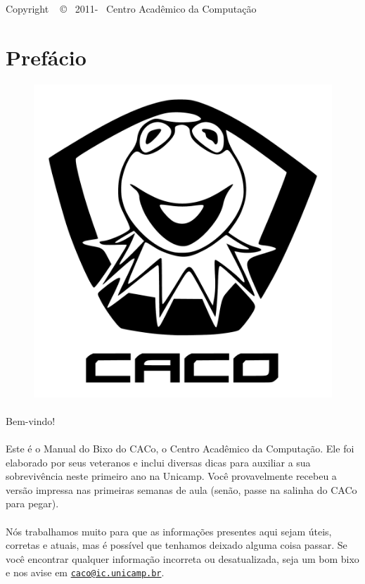\documentclass[a4paper,10pt,twocolumn]{book}
\newcommand{\email}[1]{\href{mailto:#1}{\nolinkurl{#1}}}
\begin{document}
\begin{center}
    Copyright ~ \copyright ~ 2011-\the\year ~ Centro Acadêmico da Computação
\end{center}

\clearpage

\section*{Prefácio}
\begin{figure}[H]
    \centering
    \includegraphics[width=.65\textwidth]{img/caco/logo.pdf}
\end{figure}
\paragraph{}
Bem-vindo!

\paragraph{}
Este é o Manual do Bixo do CACo, o Centro Acadêmico da Computação.  Ele foi
elaborado por seus veteranos e inclui diversas dicas para auxiliar a sua
sobrevivência neste primeiro ano na Unicamp.  Você provavelmente recebeu a
versão impressa nas primeiras semanas de aula (senão, passe na salinha do CACo
para pegar).

\paragraph{}
Nós trabalhamos muito para que as informações presentes aqui sejam úteis,
corretas e atuais, mas é possível que tenhamos deixado alguma coisa passar. Se
você encontrar qualquer informação incorreta ou desatualizada, seja um bom bixo
e nos avise em \email{caco@ic.unicamp.br}.
\end{document}
